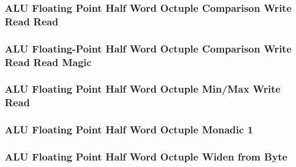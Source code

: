 \subsubsection[{\small ALU Floating Point Half Word Octuple Comparison Write Read Read}]{ALU Floating Point Half Word Octuple Comparison Write Read Read} \label{sec:format-ALU-FHOCWRR}



\subsubsection[{\small ALU Floating-Point Half Word Octuple Comparison Write Read Read Magic}]{ALU Floating-Point Half Word Octuple Comparison Write Read Read Magic} \label{sec:format-ALU-FHOCWRR.M}



\subsubsection[{\small ALU Floating Point Half Word Octuple Min/Max Write Read}]{ALU Floating Point Half Word Octuple Min/Max Write Read} \label{sec:format-ALU-FHOMMWR}



\subsubsection[{\small ALU Floating Point Half Word Octuple Monadic 1}]{ALU Floating Point Half Word Octuple Monadic 1} \label{sec:format-ALU-FHOMO1}



\subsubsection[{\small ALU Floating Point Half Word Octuple Widen from Byte}]{ALU Floating Point Half Word Octuple Widen from Byte} \label{sec:format-ALU-FHOWIDENWR}



